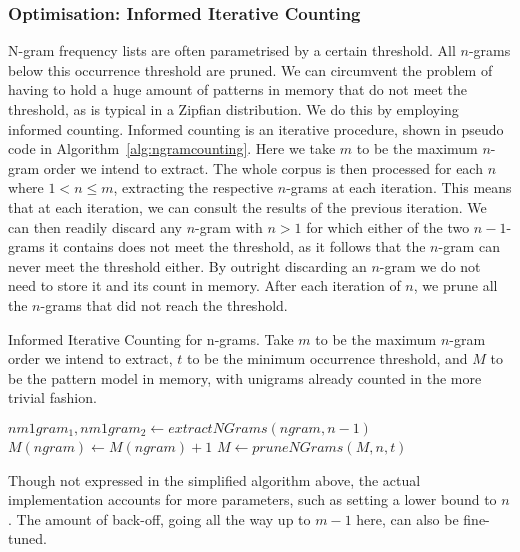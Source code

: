 \documentclass[a4paper,12pt]{article}
\begin{document}
\subsubsection{Optimisation: Informed Iterative Counting}
\label{sec:iterativecounting}

N-gram frequency lists are often parametrised by a certain threshold. All
$n$-grams below this occurrence threshold are pruned. We can circumvent the
problem of having to hold a huge amount of patterns in memory that do not meet
the threshold, as is typical in a Zipfian distribution. We do this by employing
informed counting. Informed counting is an iterative procedure, shown in pseudo
code in Algorithm~\ref{alg:ngramcounting}. Here we take $m$ to be the maximum
$n$-gram order we intend to extract. The whole corpus is then processed for
each $n$ where $1<n\leq m$, extracting the respective $n$-grams at each
iteration. This means that at each iteration, we can consult the results of the
previous iteration. We can then readily discard any $n$-gram with $n>1$ for
which either of the two $n-1$-grams it contains does not
meet the threshold, as it follows that the $n$-gram can never meet the
threshold either. By outright discarding an $n$-gram we do not need to store it
and its count in memory. After each iteration of $n$, we prune all the
$n$-grams that did not reach the threshold.


\begin{algorithm} \caption{Informed Iterative Counting for n-grams.  Take $m$
to be the maximum $n$-gram order we intend to extract, $t$ to be the minimum occurrence threshold, and $M$ to be the
pattern model in memory, with unigrams already counted in the more trivial fashion.}
\label{alg:ngramcounting}
\begin{algorithmic}
            \State  $nm1gram_1, nm1gram_2 \leftarrow extractNGrams(ngram,n-1)$
                \State $M(ngram) \leftarrow M(ngram) + 1$
            \EndIf
        \EndFor 
    \EndFor
    \State $M \leftarrow pruneNGrams(M,n,t)$
\EndFor \\
\end{algorithmic}
\end{algorithm}

Though not expressed in the simplified algorithm above, the actual
implementation accounts for more parameters, such as setting a lower bound to
$n$. The amount of back-off, going all the way up to $m-1$ here, can also be
fine-tuned.
\end{document}
